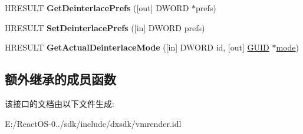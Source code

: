 \begin{DoxyCompactItemize}
\item 
\mbox{\label{interface_i_v_m_r_deinterlace_control_aabbd07076f9471ef4d65d7b324e0228c}} 
H\+R\+E\+S\+U\+LT {\bfseries Get\+Deinterlace\+Prefs} (\mbox{[}out\mbox{]} D\+W\+O\+RD $\ast$prefs)
\item 
\mbox{\label{interface_i_v_m_r_deinterlace_control_a283f2d02511e2d66a8dbc212324d30b9}} 
H\+R\+E\+S\+U\+LT {\bfseries Set\+Deinterlace\+Prefs} (\mbox{[}in\mbox{]} D\+W\+O\+RD prefs)
\item 
\mbox{\label{interface_i_v_m_r_deinterlace_control_acd2a1609eb1726e1503cdad4c5404c7f}} 
H\+R\+E\+S\+U\+LT {\bfseries Get\+Actual\+Deinterlace\+Mode} (\mbox{[}in\mbox{]} D\+W\+O\+RD id, \mbox{[}out\mbox{]} \hyperlink{interface_g_u_i_d}{G\+U\+ID} $\ast$\hyperlink{interfacevoid}{mode})
\end{DoxyCompactItemize}
\subsection*{额外继承的成员函数}


该接口的文档由以下文件生成\+:\begin{DoxyCompactItemize}
\item 
E\+:/\+React\+O\+S-\/0../sdk/include/dxsdk/vmrender.\+idl\end{DoxyCompactItemize}
